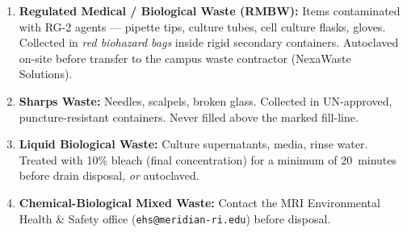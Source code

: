 \begin{enumerate}[leftmargin=1.8em, itemsep=3pt,
                  label=\textbf{\color{BSLamber}\arabic*.}]
  \item \textbf{Regulated Medical / Biological Waste (RMBW):} Items
        contaminated with RG-2 agents — pipette tips, culture tubes, cell culture flasks,
        gloves. Collected in \textit{red biohazard bags} inside rigid secondary containers.
        Autoclaved on-site before transfer to the campus waste contractor (NexaWaste
        Solutions).
  \item \textbf{Sharps Waste:} Needles, scalpels, broken glass. Collected in
        UN-approved, puncture-resistant containers. Never filled above the marked
        fill-line.
  \item \textbf{Liquid Biological Waste:} Culture supernatants, media, rinse water.
        Treated with 10\% bleach (final concentration) for a minimum of 20~minutes before
        drain disposal, \emph{or} autoclaved.
  \item \textbf{Chemical-Biological Mixed Waste:} Contact the MRI Environmental Health
        \& Safety office (\texttt{ehs@meridian-ri.edu}) before disposal.
\end{enumerate}
